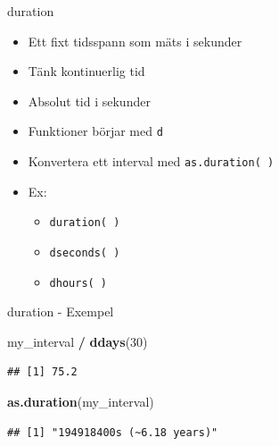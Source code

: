 \documentclass[
  11pt,
  ignorenonframetext,
  handout]{beamer}
\newenvironment{Shaded}{\begin{snugshade}}{\end{snugshade}}
\newcommand{\DecValTok}[1]{\textcolor[rgb]{0.00,0.00,0.81}{#1}}
\newcommand{\FunctionTok}[1]{\textcolor[rgb]{0.13,0.29,0.53}{\textbf{#1}}}
\newcommand{\NormalTok}[1]{#1}
\newcommand{\SpecialCharTok}[1]{\textcolor[rgb]{0.81,0.36,0.00}{\textbf{#1}}}
\providecommand{\tightlist}{%
  \setlength{\itemsep}{0pt}\setlength{\parskip}{0pt}}
\begin{document}
\begin{frame}{duration}
\protect{}\label{duration}
\begin{itemize}
\tightlist
\item
  Ett fixt tidsspann som mäts i sekunder
\item
  Tänk kontinuerlig tid
\item
  Absolut tid i sekunder
\item
  Funktioner börjar med \texttt{d}
\item
  Konvertera ett interval med \texttt{as.duration( )}
\item
  Ex:

  \begin{itemize}
  \tightlist
  \item
    \texttt{duration( )}
  \item
    \texttt{dseconds( )}
  \item
    \texttt{dhours( )}
  \end{itemize}
\end{itemize}
\end{frame}

\begin{frame}[fragile]{duration - Exempel}
\protect{}\label{duration---exempel}
\begin{Shaded}
\begin{Highlighting}[]
\NormalTok{my\_interval }\SpecialCharTok{/} \FunctionTok{ddays}\NormalTok{(}\DecValTok{30}\NormalTok{)}
\end{Highlighting}
\end{Shaded}

\begin{verbatim}
## [1] 75.2
\end{verbatim}

\begin{Shaded}
\begin{Highlighting}[]
\FunctionTok{as.duration}\NormalTok{(my\_interval)}
\end{Highlighting}
\end{Shaded}

\begin{verbatim}
## [1] "194918400s (~6.18 years)"
\end{verbatim}
\end{frame}
\end{document}
